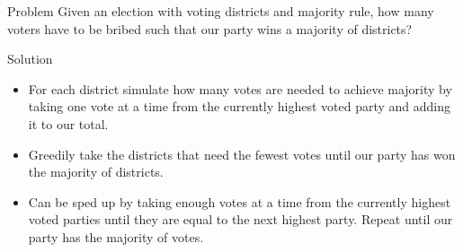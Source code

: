 \begin{slide}
  \begin{block}{Problem}
    Given an election with voting districts and majority rule, how many voters have to be bribed such
    that our party wins a majority of districts?
  \end{block}
  \pause
  \begin{block}{Solution}
    \begin{itemize}
      \item For each district simulate how many votes are needed to achieve majority by taking one 
        vote at a time from the currently highest voted party and adding it to our total.
      \item Greedily take the districts that need the fewest votes until our party has won the majority
        of districts.
      \pause
      \item Can be sped up by taking enough votes at a time from the currently highest voted parties until they are equal
        to the next highest party. Repeat until our party has the majority of votes.
    \end{itemize}
  \end{block}
\end{slide} 

